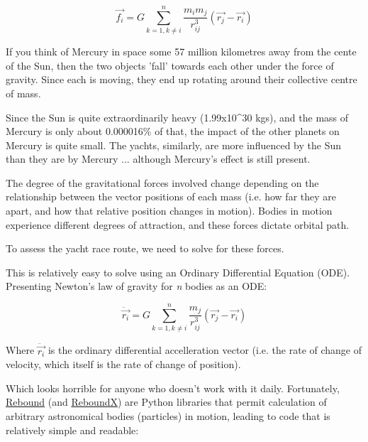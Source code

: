 \documentclass[11pt]{article}
\begin{document}
\[\overrightarrow{f_i} = G\sum_{k=1, k \neq i}^n\frac{m_i m_j}{r_{ij}^3}(\overrightarrow{r_j}-\overrightarrow{r_i})\]

If you think of Mercury in space some 57 million kilometres away from
the cente of the Sun, then the two objects 'fall' towards each other
under the force of gravity. Since each is moving, they end up rotating
around their collective centre of mass.

Since the Sun is quite extraordinarily heavy (1.99x10\^{}30 kgs), and
the mass of Mercury is only about 0.000016\% of that, the impact of the
other planets on Mercury is quite small. The yachts, similarly, are more
influenced by the Sun than they are by Mercury ... although Mercury's
effect is still present.

The degree of the gravitational forces involved change depending on the
relationship between the vector positions of each mass (i.e. how far
they are apart, and how that relative position changes in motion).
Bodies in motion experience different degrees of attraction, and these
forces dictate orbital path.

To assess the yacht race route, we need to solve for these forces.

This is relatively easy to solve using an Ordinary Differential Equation
(ODE). Presenting Newton's law of gravity for \emph{n} bodies as an ODE:

\[\ddot{\overrightarrow{r_i}} = G\sum_{k=1, k \neq i}^n\frac{m_j}{r_{ij}^3}(\overrightarrow{r_j}-\overrightarrow{r_i})\]

Where \(\ddot{\vec{r_i}}\) is the ordinary differential accelleration
vector (i.e. the rate of change of velocity, which itself is the rate of
change of position).

Which looks horrible for anyone who doesn't work with it daily.
Fortunately, \href{https://github.com/hannorein/rebound}{Rebound} (and
\href{https://github.com/dtamayo/reboundx}{ReboundX}) are Python
libraries that permit calculation of arbitrary astronomical bodies
(particles) in motion, leading to code that is relatively simple and
readable:
\end{document}
